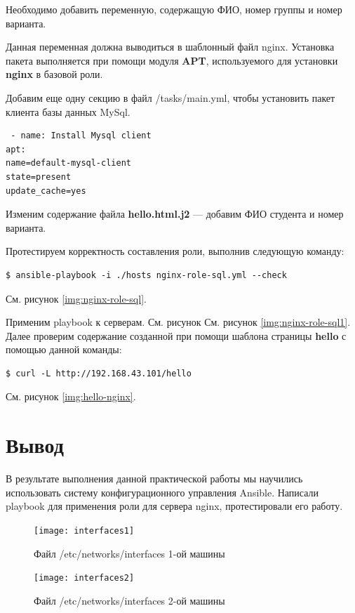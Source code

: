 \documentclass[a4paper,14pt]{extarticle}
\begin{document}
Необходимо добавить переменную, содержащую ФИО, номер группы и номер варианта. 

Данная переменная должна выводиться в шаблонный файл nginx.
Установка пакета выполняется при помощи модуля \textbf{APT}, используемого для установки \textbf{nginx} в базовой роли.


Добавим еще одну секцию в файл /tasks/main.yml, чтобы установить пакет клиента базы данных MySql.
\begin{lstlisting}
 - name: Install Mysql client
apt:
name=default-mysql-client
state=present
update_cache=yes
\end{lstlisting}

Изменим содержание файла \textbf{hello.html.j2} --- добавим ФИО студента и номер варианта.


Протестируем корректность составления роли, выполнив следующую команду:
\begin{lstlisting}
$ ansible-playbook -i ./hosts nginx-role-sql.yml --check
\end{lstlisting}
См. рисунок \ref{img:nginx-role-sql}.

Применим playbook к серверам. См. рисунок См. рисунок \ref{img:nginx-role-sql1}. Далее проверим содержание созданной при помощи шаблона страницы \textbf{hello} с помощью данной команды:
\begin{lstlisting}
$ curl -L http://192.168.43.101/hello
\end{lstlisting}
См. рисунок \ref{img:hello-nginx}.


\section{Вывод}
В результате выполнения данной практической работы мы научились
использовать систему конфигурационного управления Ansible. Написали playbook для применения роли для сервера nginx, протестировали его работу.

\newpage
{\centering
{}
}
\label{A}
\begin{figure}[hptb]
	\centering
	\texttt{[image: interfaces1]}
	\caption{Файл /etc/networks/interfaces 1-ой машины}
	\label{img:interfaces1}
\end{figure}

\begin{figure}[hptb]
	\centering
	\texttt{[image: interfaces2]}
	\caption{Файл /etc/networks/interfaces 2-ой машины}
	\label{img:interfaces2}
\end{figure}
\newpage
\end{document}
